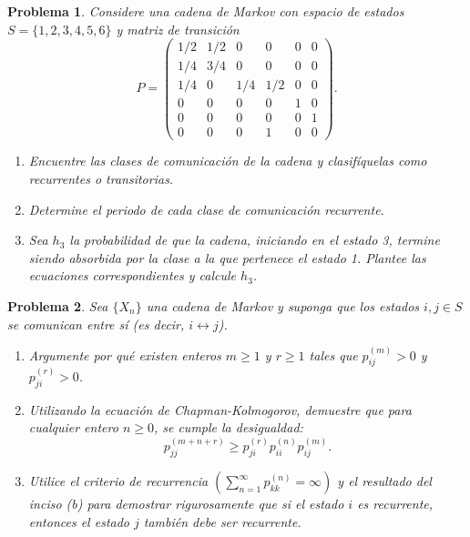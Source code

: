 \documentclass[12pt]{article}
\newtheorem{problem}{Problema}
\begin{document}
\begin{problem} Considere una cadena de Markov con espacio de estados $S = \{1,2,3,4,5,6\}$ y matriz de transición
\[
P = \begin{pmatrix}
1/2 & 1/2 & 0   & 0   & 0   & 0   \\[3pt]
1/4 & 3/4 & 0   & 0   & 0   & 0   \\[3pt]
1/4 & 0   & 1/4 & 1/2 & 0   & 0   \\[3pt]
0   & 0   & 0   & 0   & 1   & 0   \\[3pt]
0   & 0   & 0   & 0   & 0   & 1   \\[3pt]
0   & 0   & 0   & 1   & 0   & 0
\end{pmatrix}.
\]
\begin{enumerate}
    \item[(a)] Encuentre las clases de comunicación de la cadena y clasifíquelas como recurrentes o transitorias.
    \item[(b)] Determine el periodo de cada clase de comunicación recurrente.
    \item[(c)] Sea $h_3$ la probabilidad de que la cadena, iniciando en el estado 3, termine siendo absorbida por la clase a la que pertenece el estado 1. Plantee las ecuaciones correspondientes y calcule $h_3$.
\end{enumerate}
\end{problem}

\begin{problem} Sea $\{X_n\}$ una cadena de Markov y suponga que los estados $i, j \in S$ se comunican entre sí (es decir, $i \leftrightarrow j$). 
\begin{enumerate}
    \item[(a)] Argumente por qué existen enteros $m \geq 1$ y $r \geq 1$ tales que $p_{ij}^{(m)} > 0$ y $p_{ji}^{(r)} > 0$.
    \item[(b)] Utilizando la ecuación de Chapman-Kolmogorov, demuestre que para cualquier entero $n \geq 0$, se cumple la desigualdad:
    \[
        p_{jj}^{(m+n+r)} \geq p_{ji}^{(r)} p_{ii}^{(n)} p_{ij}^{(m)}.
    \]
    \item[(c)] Utilice el criterio de recurrencia $\left(\sum_{n=1}^{\infty} p_{kk}^{(n)} = \infty \right)$ y el resultado del inciso (b) para demostrar rigurosamente que si el estado $i$ es recurrente, entonces el estado $j$ también debe ser recurrente.
\end{enumerate}
\end{problem}
\end{document}
